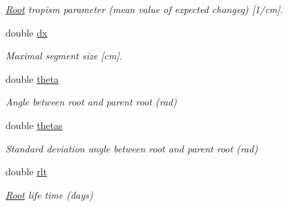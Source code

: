\begin{DoxyCompactItemize}
\begin{DoxyCompactList}\small\item\em \hyperlink{classCPlantBox_1_1Root}{Root} tropism parameter (mean value of expected changeg) \mbox{[}1/cm\mbox{]}. \end{DoxyCompactList}\item 
\mbox{\label{classCPlantBox_1_1RootRandomOrganParameter_a52190f816c5152c52108544da1ef6508}} 
double \hyperlink{classCPlantBox_1_1RootRandomOrganParameter_a52190f816c5152c52108544da1ef6508}{dx}
\begin{DoxyCompactList}\small\item\em Maximal segment size \mbox{[}cm\mbox{]}. \end{DoxyCompactList}\item 
\mbox{\label{classCPlantBox_1_1RootRandomOrganParameter_a149f3bd774172e12c39fc04380069853}} 
double \hyperlink{classCPlantBox_1_1RootRandomOrganParameter_a149f3bd774172e12c39fc04380069853}{theta}
\begin{DoxyCompactList}\small\item\em Angle between root and parent root (rad) \end{DoxyCompactList}\item 
\mbox{\label{classCPlantBox_1_1RootRandomOrganParameter_ac1d64e772d445b1548f46f72fe663120}} 
double \hyperlink{classCPlantBox_1_1RootRandomOrganParameter_ac1d64e772d445b1548f46f72fe663120}{thetas}
\begin{DoxyCompactList}\small\item\em Standard deviation angle between root and parent root (rad) \end{DoxyCompactList}\item 
\mbox{\label{classCPlantBox_1_1RootRandomOrganParameter_a6ed82d7f234944e5d9c9acbfdabe021e}} 
double \hyperlink{classCPlantBox_1_1RootRandomOrganParameter_a6ed82d7f234944e5d9c9acbfdabe021e}{rlt}
\begin{DoxyCompactList}\small\item\em \hyperlink{classCPlantBox_1_1Root}{Root} life time (days) \end{DoxyCompactList}\item 
\mbox{\label{classCPlantBox_1_1RootRandomOrganParameter_aa1b3e5e603bf9e155aaa9cbf22cc9f20}} 

\end{DoxyCompactItemize}
